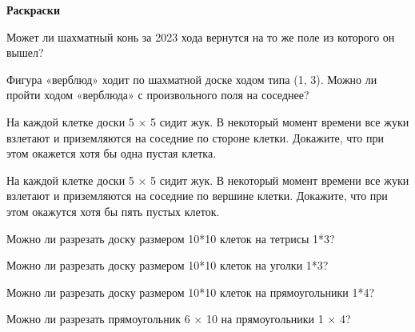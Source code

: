 \centerline{\bf \Huge Раскраски}


 Может ли шахматный конь за 2023 хода вернутся на то же поле из которого он вышел?

 Фигура «верблюд» ходит по шахматной доске ходом типа (1, 3). Можно ли пройти ходом «верблюда» с произвольного поля на соседнее?

 На каждой клетке доски 5 × 5 сидит жук. В некоторый момент времени все жуки взлетают и приземляются на соседние по стороне клетки. Докажите, что при этом окажется хотя бы одна пустая клетка.

 На каждой клетке доски 5 × 5 сидит жук. В некоторый момент времени все жуки взлетают и приземляются на соседние по вершине клетки. Докажите, что при этом окажутся хотя бы пять пустых клеток.

 Можно ли разрезать доску размером 10*10 клеток на тетрисы 1*3?

 Можно ли разрезать доску размером 10*10 клеток на уголки 1*3?

 Можно ли разрезать доску размером 10*10 клеток на прямоугольники 1*4?
  
 Можно ли разрезать прямоугольник 6 × 10 на прямоугольники 1 × 4?